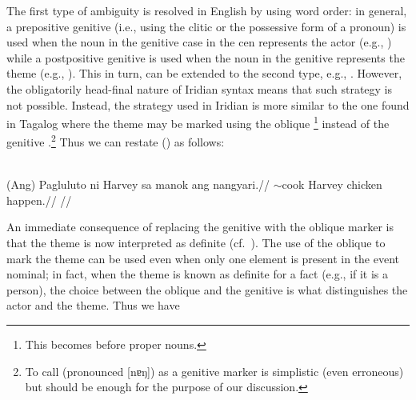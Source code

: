 The first type of ambiguity is resolved in English by using word order: in general, a prepositive genitive (i.e., using the clitic  or the possessive form of a pronoun) is used when the noun in the genitive case in the {\sc cen} represents the actor (e.g., ) while a postpositive genitive is used when the noun in the genitive represents the theme (e.g., ). This in turn, can be extended to the second type, e.g., . However, the obligatorily head-final nature of Iridian syntax means that such strategy is not possible. Instead, the strategy used in Iridian is more similar to the one found in Tagalog where the theme may be marked using the oblique \footnote{This becomes  before proper nouns.} instead of the genitive .\footnote{
    To call  (pronounced [nɐŋ]) as a genitive marker is simplistic (even erroneous) but should be enough for the purpose of our discussion.
} Thus we can restate () as follows:

\\
\begingl
    \gla (Ang) Pagluluto ni Harvey {sa} manok ang nangyari.//
    \glb \Nom{} \Ger{}$\sim$cook \Gen{} Harvey \Obl{} chicken \Nom{} happen.\Pfv{}//
    \glft {}//
\endgl
\xe

An immediate consequence of replacing the genitive  with the oblique marker  is that the theme is now interpreted as definite (cf.~\cite[3,\,40]{kaufman2009}). The use of the oblique to mark the theme can be used even when only one element is present in the event nominal; in fact, when the theme is known as definite for a fact (e.g., if it is a person), the choice between the oblique and the genitive is what distinguishes the actor and the theme. Thus we have

